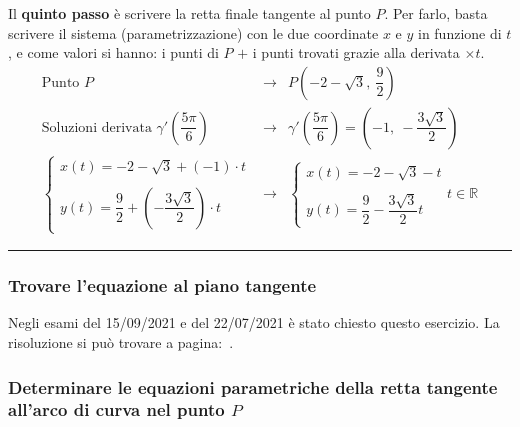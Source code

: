 \documentclass[a4paper]{article}
\newcommand{\longline}{\noindent\rule{\textwidth}{0.4pt}}
\begin{document}
	\noindent
	Il \textbf{quinto passo} è scrivere la retta finale tangente al punto $P$. Per farlo, basta scrivere il sistema (parametrizzazione) con le due coordinate $x$ e $y$ in funzione di $t$, e come valori si hanno: i punti di $P$ $+$ i punti trovati grazie alla derivata $\times t$.
	\begin{equation*}
		\begin{array}{rcl}
			\text{Punto }P	&\longrightarrow& P\left(-2-\sqrt{3}, \: \dfrac{9}{2}\right) \\ [1.5em]
			\text{Soluzioni derivata }\gamma'\left(\dfrac{5\pi}{6}\right) &\longrightarrow& \gamma'\left(\dfrac{5\pi}{6}\right) = \left(-1, \: -\dfrac{3\sqrt{3}}{2}\right) \\ [1.5em]
			\begin{cases}
				x\left(t\right) = -2-\sqrt{3} + \left(-1\right) \cdot t \\
				\\
				y\left(t\right) = \dfrac{9}{2} + \left(-\dfrac{3\sqrt{3}}{2}\right) \cdot t
			\end{cases} & \longrightarrow & \begin{cases}
				x\left(t\right) = -2-\sqrt{3} - t \\
				\\
				y\left(t\right) = \dfrac{9}{2} - \dfrac{3\sqrt{3}}{2} t
			\end{cases} t \in \mathbb{R}
		\end{array}
	\end{equation*}\:\newline

	\longline

	\subsubsection{Trovare l'equazione al piano tangente}

	Negli esami del 15/09/2021 e del 22/07/2021 è stato chiesto questo esercizio. La risoluzione si può trovare a pagina:~\pageref{par: trovare l'equazione al piano tangente}.\newpage

	\subsubsection{Determinare le equazioni parametriche della retta tangente all'arco di curva nel punto $P$}
\end{document}
